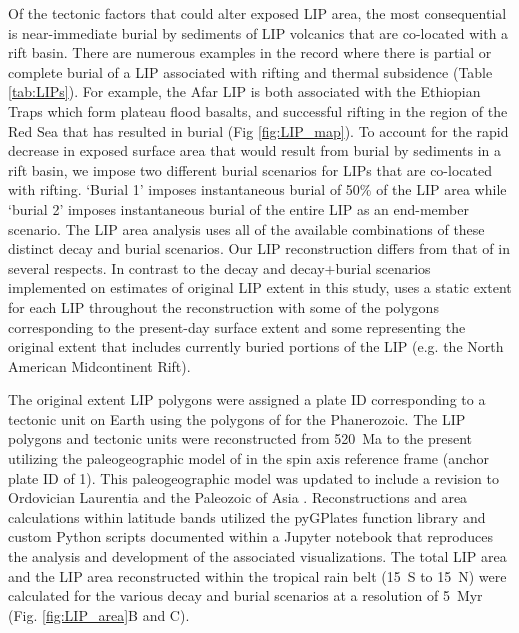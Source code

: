\documentclass[11pt,letterpaper]{article}
\begin{document}
Of the tectonic factors that could alter exposed LIP area, the most consequential is near-immediate burial by sediments of LIP volcanics that are co-located with a rift basin. There are numerous examples in the record where there is partial or complete burial of a LIP associated with rifting and thermal subsidence (Table \ref{tab:LIPs}). For example, the Afar LIP is both associated with the Ethiopian Traps which form plateau flood basalts, and successful rifting in the region of the Red Sea that has resulted in burial (Fig \ref{fig:LIP_map}). To account for the rapid decrease in exposed surface area that would result from burial by sediments in a rift basin, we impose two different burial scenarios for LIPs that are co-located with rifting. `Burial 1' imposes instantaneous burial of 50$\%$ of the LIP area while `burial 2' imposes instantaneous burial of the entire LIP as an end-member scenario. The LIP area analysis uses all of the available combinations of these distinct decay and burial scenarios. Our LIP reconstruction differs from that of \citet{Johansson2018a} in several respects. In contrast to the decay and decay+burial scenarios implemented on estimates of original LIP extent in this study, \citet{Johansson2018a} uses a static extent for each LIP throughout the reconstruction with some of the polygons corresponding to the present-day surface extent and some representing the original extent that includes currently buried portions of the LIP (e.g. the North American Midcontinent Rift).

The original extent LIP polygons were assigned a plate ID corresponding to a tectonic unit on Earth using the polygons of \citet{Torsvik2016a} for the Phanerozoic. The LIP polygons and tectonic units were reconstructed from 520~Ma to the present utilizing the paleogeographic model of \citet{Torsvik2016a} in the spin axis reference frame (anchor plate ID of 1). This paleogeographic model was updated to include a revision to Ordovician Laurentia \citep{Swanson-Hysell2017a} and the Paleozoic of Asia \citep{Domeier2018a}. Reconstructions and area calculations within latitude bands utilized the pyGPlates function library and custom Python scripts documented within a Jupyter notebook that reproduces the analysis and development of the associated visualizations. The total LIP area and the LIP area reconstructed within the tropical rain belt (15\textdegree~S to 15\textdegree~N) were calculated for the various decay and burial scenarios at a resolution of 5~Myr (Fig. \ref{fig:LIP_area}B and C).
\end{document}
